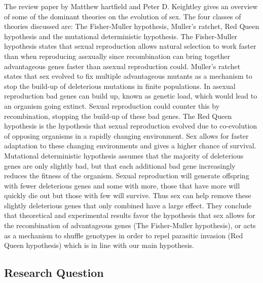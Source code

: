 The review paper by Matthew hartfield and Peter D. Keightley \cite{matthewhartfield} gives an overview of some of the dominant theories on the evolution of sex. 
The four classes of theories discussed are: The Fisher-Muller hypothesis, Muller's ratchet, Red Queen hypothesis and the mutational deterministic hypothesis.
The Fisher-Muller hypothesis states that sexual reproduction allows natural selection to work faster than when reproducing asexually since recombination can bring together advantageous genes faster than asexual reproduction could.
Muller's ratchet states that sex evolved to fix multiple advantageous mutants as a mechanism to stop the build-up of deleterious mutations in finite populations. 
In asexual reproduction bad genes can build up, known as genetic load, which would lead to an organism going extinct. 
Sexual reproduction could counter this by recombination, stopping the build-up of these bad genes.
The Red Queen hypothesis is the hypothesis that sexual reproduction evolved due to co-evolution of opposing organisms in a rapidly changing environment. 
Sex allows for faster adaptation to these changing environments and gives a higher chance of survival.
Mutational deterministic hypothesis assumes that the majority of deleterious genes are only slightly bad, but that each additional bad gene increasingly reduces the fitness of the organism. 
Sexual reproduction will generate offspring with fewer deleterious genes and some with more, those that have more will quickly die out but those with few will survive. 
Thus sex can help remove these slightly deleterious genes that only combined have a large effect.
They conclude that theoretical and experimental results favor the hypothesis that sex allows for the recombination of advantageous genes (The Fisher-Muller hypothesis), or acts as a mechanism to shuffle genotypes in order to repel parasitic invasion (Red Queen hypothesis) which is in line with our main hypothesis.

\subsection{Research Question}

